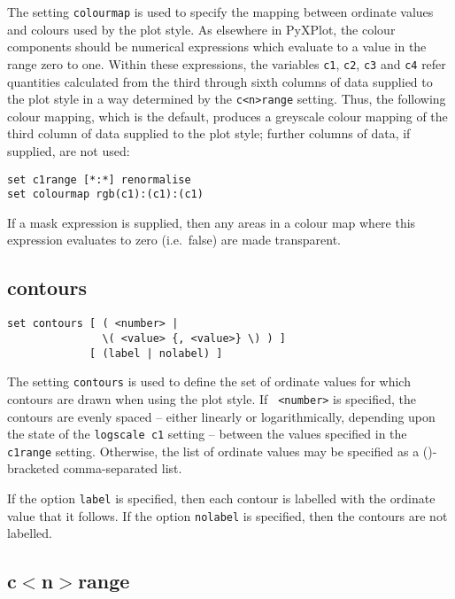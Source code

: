 The setting {\tt colourmap} is used to specify the mapping between ordinate
values and colours used by the  plot style. As elsewhere in
PyXPlot, the colour components should be numerical expressions which evaluate
to a value in the range zero to one. Within these expressions, the variables
{\tt c1}, {\tt c2}, {\tt c3} and {\tt c4} refer quantities calculated from the
third through sixth columns of data supplied to the  plot
style in a way determined by the {\tt c<n>range} setting.  Thus, the following
colour mapping, which is the default, produces a greyscale colour mapping of
the third column of data supplied to the  plot style; further
columns of data, if supplied, are not used:

\begin{verbatim}
set c1range [*:*] renormalise
set colourmap rgb(c1):(c1):(c1)
\end{verbatim}

If a mask expression is supplied, then any areas in a colour map where this
expression evaluates to zero (i.e.\ false) are made transparent.


\subsection{contours}

\begin{verbatim}
set contours [ ( <number> |
               \( <value> {, <value>} \) ) ]
             [ (label | nolabel) ]
\end{verbatim}

The setting {\tt contours} is used to define the set of ordinate values for
which contours are drawn when using the  plot style. If {\tt
<number>} is specified, the contours are evenly spaced -- either linearly or
logarithmically, depending upon the state of the {\tt logscale c1} setting --
between the values specified in the {\tt c1range} setting. Otherwise, the list
of ordinate values may be specified as a ()-bracketed comma-separated list.

If the option {\tt label} is specified, then each contour is labelled with the
ordinate value that it follows. If the option {\tt nolabel} is specified, then
the contours are not labelled.


\subsection{c$<$n$>$range}

